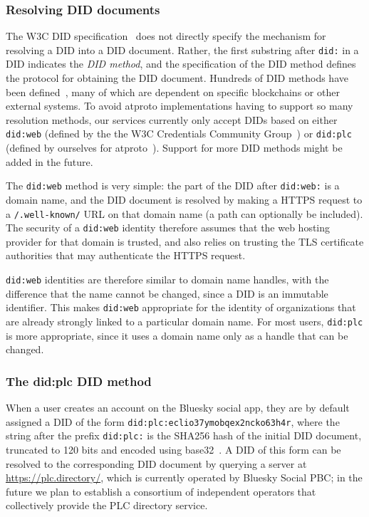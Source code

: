 \documentclass[sigconf,nonacm]{acmart}
\begin{document}
\subsubsection{Resolving DID documents}

The W3C DID specification~\cite{DIDCore} does not directly specify the mechanism for resolving a DID into a DID document.
Rather, the first substring after \texttt{did:} in a DID indicates the \emph{DID method}, and the specification of the DID method defines the protocol for obtaining the DID document.
Hundreds of DID methods have been defined~\cite{DIDMethods}, many of which are dependent on specific blockchains or other external systems.
To avoid atproto implementations having to support so many resolution methods, our services currently only accept DIDs based on either \texttt{did:web} (defined by the the W3C Credentials Community Group~\cite{did:web}) or \texttt{did:plc} (defined by ourselves for atproto~\cite{did:plc}).
Support for more DID methods might be added in the future.

The \texttt{did:web} method is very simple: the part of the DID after \texttt{did:web:} is a domain name, and the DID document is resolved by making a HTTPS request to a \texttt{/.well-known/} URL on that domain name (a path can optionally be included).
The security of a \texttt{did:web} identity therefore assumes that the web hosting provider for that domain is trusted, and also relies on trusting the TLS certificate authorities that may authenticate the HTTPS request.

\texttt{did:web} identities are therefore similar to domain name handles, with the difference that the name cannot be changed, since a DID is an immutable identifier.
This makes \texttt{did:web} appropriate for the identity of organizations that are already strongly linked to a particular domain name.
For most users, \texttt{did:plc} is more appropriate, since it uses a domain name only as a handle that can be changed.

\subsubsection{The did:plc DID method}

When a user creates an account on the Bluesky social app, they are by default assigned a DID of the form \texttt{did:plc:eclio37ymobqex2ncko63h4r}, where the string after the prefix \texttt{did:plc:} is the SHA256 hash of the initial DID document, truncated to 120 bits and encoded using base32~\cite{did:plc}.
A DID of this form can be resolved to the corresponding DID document by querying a server at \url{https://plc.directory/}, which is currently operated by Bluesky Social PBC; in the future we plan to establish a consortium of independent operators that collectively provide the PLC directory service.
\end{document}
